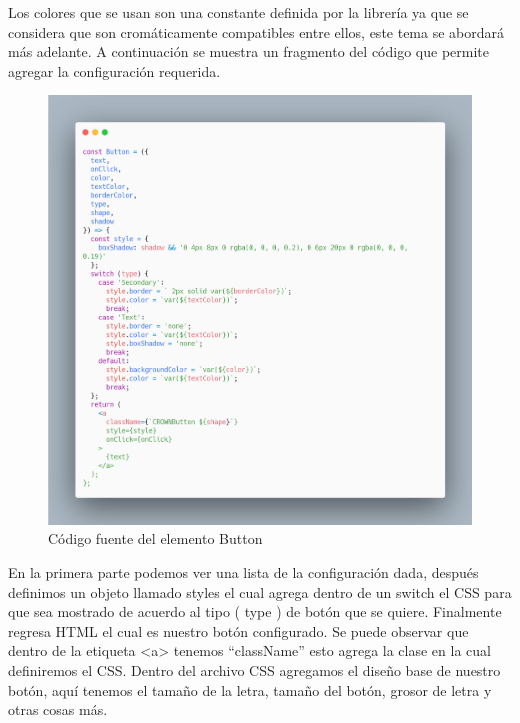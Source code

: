 Los colores que se usan son una constante definida por la librería ya que se considera que son cromáticamente compatibles entre ellos, este tema se abordará más adelante.
A continuación se muestra un fragmento del código que permite agregar la configuración requerida.
\newline
\newline
\begin{figure}[H]
    \includegraphics[width=1\textwidth]{./Imagenes/carbon-9.png}
    \caption[Código fuente del elemento Button]{Código fuente del elemento Button}
    \end{figure}
\newline
\newline
En la primera parte podemos ver una lista de la configuración dada,  después definimos un objeto llamado styles el cual agrega dentro de un switch el CSS para que sea mostrado de acuerdo al tipo ( type ) de botón que se quiere. Finalmente regresa HTML el cual es nuestro botón configurado.
Se puede observar que dentro de la etiqueta <a> tenemos “className” esto agrega la clase en la cual definiremos el CSS.
Dentro del archivo CSS agregamos el diseño base de nuestro botón, aquí tenemos el  tamaño de la letra, tamaño del botón, grosor de letra y otras cosas más.
\newline
\newline
